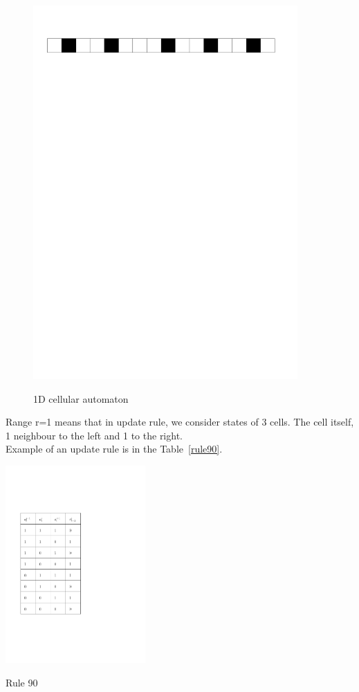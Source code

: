 \begin{figure}[htbp]
 \centering 
 \includegraphics[width=0.9\textwidth]{./img/1Dline}
 \label{1d}
 \caption{1D cellular automaton}
\end{figure}

Range r=1 means that in update rule, 
we consider states of 3 cells. The cell itself, 
1 neighbour to the left and 1 to the right.\\

Example of an update rule is in the Table~\ref{rule90}.\\


\begin{table}[htbp]
 \centering
 \includegraphics[width=0.4\textwidth]{./img/1Drule}
 \caption{Rule 90}
 \label{rule90}
\end{table}

